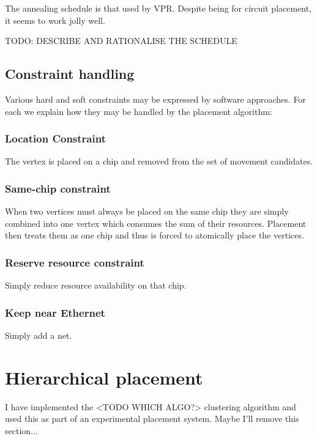 			The annealing schedule is that used by VPR. Despite being for circuit
			placement, it seems to work jolly well.
			
			TODO: DESCRIBE AND RATIONALISE THE SCHEDULE
		
		\subsection{Constraint handling}
			
			Various hard and soft constraints may be expressed by software
			approaches. For each we explain how they may be handled by the placement
			algorithm:
			
			\subsubsection{Location Constraint}
				
				The vertex is placed on a chip and removed from the set of movement
				candidates.
			
			\subsubsection{Same-chip constraint}
				
				When two vertices must always be placed on the same chip they are
				simply combined into one vertex which consumes the sum of their
				resources. Placement then treats them as one chip and thus is forced to
				atomically place the vertices.
			
			\subsubsection{Reserve resource constraint}
				
				Simply reduce resource availability on that chip.
			
			\subsubsection{Keep near Ethernet}
				
				Simply add a net.
	
	\section{Hierarchical placement}
		
		I have implemented the <TODO WHICH ALGO?> clustering algorithm and used
		this as part of an experimental placement system. Maybe I'll remove this
		section...
		
